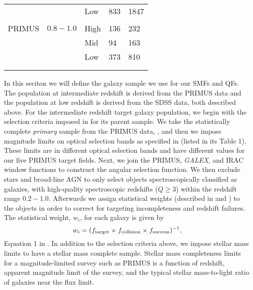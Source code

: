 \documentclass{emulateapj}
\begin{document}
\begin{table*}
\begin{center}
\begin{tabular}{lllll}
            &               &Low            &833                       &1847                           \\
            &               &               &                       &                           \\ \hline
  PRIMUS    &$0.8-1.0$      &High           &136                       &232                           \\
            &               &Mid            &94                       &163                           \\
            &               &Low            &373                       &810                           \\
            &               &               &                       &                           \\ \hline
  \multicolumn{5}{l}{}                                             \\       
    \end{tabular}
  \end{center}
\end{table*}
In this seciton we will define the galaxy sample we use for our SMFs and QFs.
The population at intermediate redshift is derived from the PRIMUS data and the population at low redshift is derived from the SDSS data, both described above.
For the intermediate redshift target galaxy population, we begin with the selection criteria imposed in \cite{Moustakas:2013aa} for its parent sample.
We take the statistically complete {\em primary} sample from the PRIMUS data, \cite{Coil:2011aa}, and then we impose magnitude limits on optical selection bands as specified in 
\cite{Moustakas:2013aa} (listed in its Table 1).
These limits are in different optical selection bands and have different values for our five PRIMUS target fields.
Next, we join the PRIMUS, {\em GALEX}, and IRAC window functions to construct the angular selection function.
We then exclude stars and broad-line AGN to only select objects spectroscopically classified as galaxies, with high-quality spectroscopic redshifts ($Q \geq 3$) within the 
redshift range $0.2 - 1.0$.
Afterwards we assign statistical weights (described in \cite{Coil:2011aa} and \cite{Cool:2013aa}) to the objects in order to correct for targeting incompleteness and redshift 
failures.
The statistical weight, $w_i$, for each galaxy is given by
\begin{equation}
w_{i} = (f_{\rm{target}} \times f_{\rm{collision}} \times f_{\rm{success}})^{-1},
\end{equation}
Equation 1 in \cite{Moustakas:2013aa}.
In addition to the selection criteria above, we impose stellar mass limits to have a stellar mass complete sample.  
Stellar mass completeness limits for a magnitude-limited survey such as PRIMUS is a function of redshift, apparent magnitude limit of the survey, and the typical stellar 
mass-to-light ratio of galaxies near the flux limit.
\end{document}
